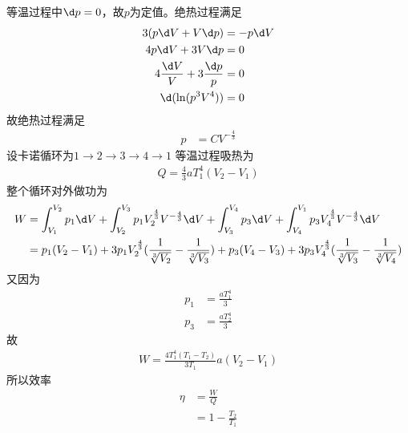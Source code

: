 \documentclass{phyasgn}
\begin{document}
\begin{sol}[9]
    等温过程中$\d p=0$，故$p$为定值。绝热过程满足
    \begin{align*}
        3(p\d V+V\d p)&=-p\d V\\
        4p\d V+3V\d p&=0\\
        4\frac{\d V}{V}+3\frac{\d p}{p}&=0\\
        \d(\ln(p^3V^4))&=0
    \end{align*}
    故绝热过程满足
    \begin{align*}
        p&=CV^{-\frac{4}{3}}
    \end{align*}
    设卡诺循环为$1\to2\to3\to4\to1$
    等温过程吸热为
    \begin{align*}
        Q=\frac{4}{3}aT_1^4(V_2-V_1)
    \end{align*}
    整个循环对外做功为
    \begin{align*}
        W&=\int_{V_1}^{V_2}p_1\d V+\int_{V_2}^{V_3}p_1V_2^{\frac{4}{3}}V^{-\frac{4}{3}}\d V+\int_{V_3}^{V_4}p_3\d V+\int_{V_4}^{V_1}p_3V_4^{\frac{4}{3}}V^{-\frac{4}{3}}\d V\\
        &=p_1(V_2-V_1)+3p_1V_2^{\frac{4}{3}}(\frac{1}{\sqrt[3]{V_2}}-\frac{1}{\sqrt[3]{V_3}})+p_3(V_4-V_3)+3p_3V_4^{\frac{4}{3}}(\frac{1}{\sqrt[3]{V_3}}-\frac{1}{\sqrt[3]{V_4}})
    \end{align*}
    又因为
    \begin{align*}
        p_1&=\frac{aT_1^4}{3}\\
        p_3&=\frac{aT_2^4}{3}
    \end{align*}
    故
    \begin{align*}
        W=\frac{4T_1^4(T_1-T_2)}{3T_1}a(V_2-V_1)
    \end{align*}
    所以效率
    \begin{align*}
        \eta&=\frac{W}{Q}\\
        &=1-\frac{T_2}{T_1}
    \end{align*}
\end{sol}\par
\end{document}
